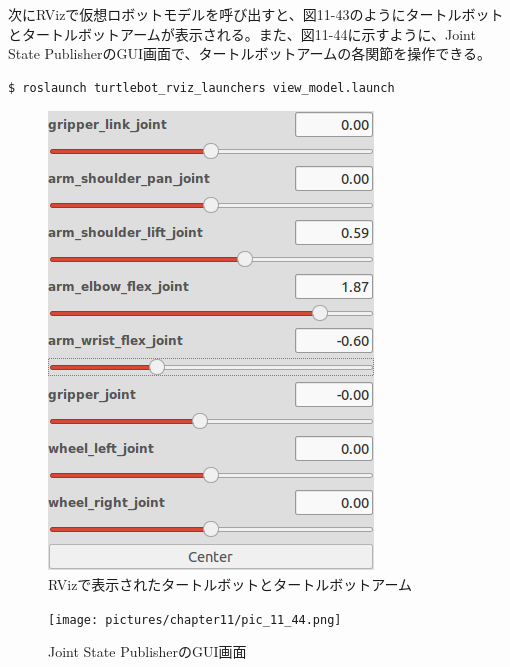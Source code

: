次にRVizで仮想ロボットモデルを呼び出すと、図11-43のようにタートルボットとタートルボットアームが表示される。また、図11-44に示すように、Joint State PublisherのGUI画面で、タートルボットアームの各関節を操作できる。

\begin{lstlisting}[language=ROS]
$ roslaunch turtlebot_rviz_launchers view_model.launch
\end{lstlisting}

\begin{figure}[ht]
  \centering
  \includegraphics[width=\columnwidth]{pictures/chapter11/pic_11_43.png}
  \caption{RVizで表示されたタートルボットとタートルボットアーム}
\end{figure}

\begin{figure}[ht]
  \centering
  \texttt{[image: pictures/chapter11/pic\_11\_44.png]}
  \caption{Joint State PublisherのGUI画面}
\end{figure}

